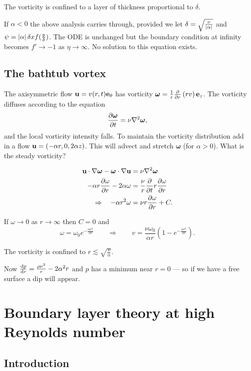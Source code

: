 \documentclass{notes}
\newcommand{\om}{\boldsymbol{\omega}}
\newcommand{\e}{\mathbf{e}}
\theoremstyle{plain}
\begin{document}
The vorticity is confined to a layer of thickness proportional to $\delta$.

If $\alpha < 0$ the above analysis carries through, provided we
let $\delta = \sqrt{\frac{\nu}{\left|\alpha\right|}}$ and
$\psi = \left|\alpha\right| \delta x f(\tfrac{y}{\delta})$.  The ODE
is unchanged but the boundary condition at infinity becomes
$f' \to -1$ as $\eta \to \infty$.  No solution to this equation exists.

\section{The bathtub vortex}

The axisymmetric flow $\vu = v(r,t) \e_\theta$ has vorticity
$\om = \frac{1}{r} \pd{}{r} \left(r v\right) \e_z$.  The vorticity
diffuses according to the equation
\[
\pd{\om}{t} = \nu \nabla^2 \om,
\]
and the local vorticity intensity falls.  To maintain the vorticity
distribution add in a flow $\mathbf{u} = (-\alpha r,0,2 \alpha z)$.  This
will advect and stretch $\om$ (for $\alpha > 0$).  What is the
steady vorticity?

\begin{align*}
\vu \cdot \nabla \om - \om \cdot \nabla \vu &= \nu \nabla^2 \om \\
- \alpha r \pd{\omega}{r} - 2 \alpha \omega &= \frac{\nu}{r}
\pd{}{t} r \pd{\omega}{r} \\
\Rightarrow \quad
- \alpha r^2 \omega &= \nu r \pd{\omega}{r} + C.
\end{align*}

If $\omega \to 0$ as $r \to \infty$ then $C = 0$ and
\[
\omega = \omega_0 e^{-\frac{\alpha r^2}{2 \nu}}
\qquad \Rightarrow \qquad
v = \frac{\nu \omega_0}{\alpha r} \left( 1 - e^{-\frac{\alpha r^2}{2 \nu}}
\right).
\]

The vorticity is confined to $r \lesssim \sqrt{\frac{\nu}{\alpha}}$.

Now $\frac{\mathrm{d} p}{\mathrm{d} r} = \frac{\rho \nu^2}{r} - 2 \alpha^2 r$ and $p$
has a minimum near $r=0$ --- so if we have a free surface a dip
will appear.

\chapter[Boundary layers]{Boundary layer theory at high Reynolds number}

\section{Introduction}
\end{document}
